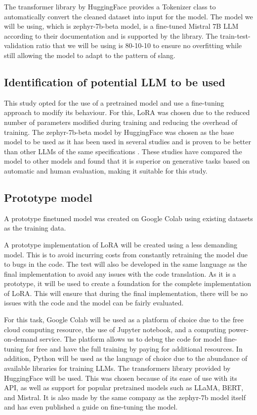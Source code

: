 The transformer library by HuggingFace provides a Tokenizer class to automatically convert the cleaned dataset into input for the model.
The model we will be using, which is zephyr-7b-beta model, is a fine-tuned Mistral 7B LLM according to their documentation and is supported by the library.
The train-test-validation ratio that we will be using is 80-10-10 to ensure no overfitting while still allowing the model to adapt to the pattern of slang.  

\subsection{Identification of potential LLM to be used}
This study opted for the use of a pretrained model and use a fine-tuning approach to modify its behaviour. For this, LoRA was chosen due to the reduced number of parameters modified during training and reducing the overhead of training. The zephyr-7b-beta model by HuggingFace was chosen as the base model to be used as it has been used in several studies and is proven to be better than other LLMs of the same specifications \cite{Zhu_2023} \cite{zhao2024loraland310finetuned}. These studies have compared the model to other models and found that it is superior on generative tasks based on automatic and human evaluation, making it suitable for this study.

\subsection{Prototype model}
A prototype finetuned model was created on Google Colab using existing datasets as the training data.  

A prototype implementation of LoRA will be created using a less demanding model.
This is to avoid incurring costs from constantly retraining the model due to bugs in the code.
The test will also be developed in the same language as the final implementation to avoid any issues with the code translation.
As it is a prototype, it will be used to create a foundation for the complete implementation of LoRA.
This will ensure that during the final implementation, there will be no issues with the code and the model can be fairly evaluated.

For this task, Google Colab will be used as a platform of choice due to the free cloud computing resource, the use of Jupyter notebook, and a computing power-on-demand service. The platform allows us to debug the code for model fine-tuning for free and have the full training by paying for additional resources.
In addition, Python will be used as the language of choice due to the abundance of available libraries for training LLMs. The transformers library provided by HuggingFace will be used.
This was chosen because of its ease of use with its API, as well as support for popular pretrained models such as LLaMA, BERT, and Mistral.
It is also made by the same company as the zephyr-7b model itself and has even published a guide on fine-tuning the model.


